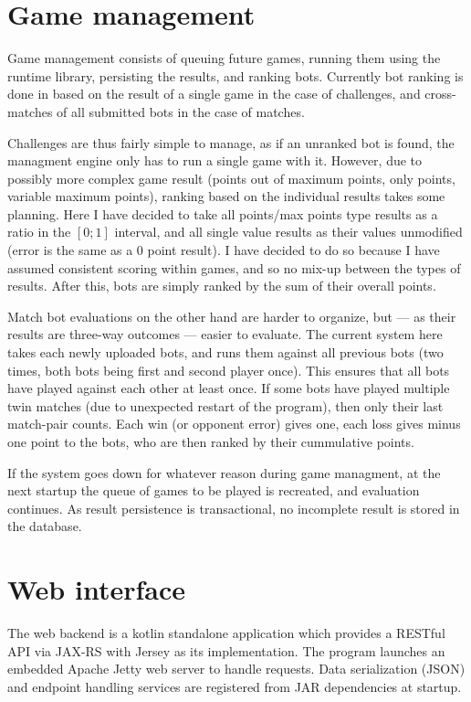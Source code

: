 	\section{Game management}

	Game management consists of queuing future games, running them using the runtime library, persisting the results, and ranking bots. Currently bot ranking is done in based on the result of a single game in the case of challenges, and cross-matches of all submitted bots in the case of matches.
	
	Challenges are thus fairly simple to manage, as if an unranked bot is found, the managment engine only has to run a single game with it. However, due to possibly more complex game result (points out of maximum points, only points, variable maximum points), ranking based on the individual results takes some planning. Here I have decided to take all points/max points type results as a ratio in the $[0;1]$ interval, and all single value results as their values unmodified (error is the same as a  0 point result). I have decided to do so because I have assumed consistent scoring within games, and so no mix-up between the types of results. After this, bots are simply ranked by the sum of their overall points.
	
	Match bot evaluations on the other hand are harder to organize, but --- as their results are three-way outcomes --- easier to evaluate. The current system here takes each newly uploaded bots, and runs them against all previous bots (two times, both bots being first and second player once). This ensures that all bots have played against each other at least once. If some bots have played multiple twin matches (due to unexpected restart of the program), then only their last match-pair counts. Each win (or opponent error) gives one, each loss gives minus one point to the bots, who are then ranked by their cummulative points.
	
	If the system goes down for whatever reason during game managment, at the next startup the queue of games to be played is recreated, and evaluation continues. As result persistence is transactional, no incomplete result is stored in the database.

	\section{Web interface}
	
	The web backend is a kotlin standalone application which provides a RESTful API via JAX-RS with Jersey as its implementation. The program launches an embedded Apache Jetty web server to handle requests. Data serialization (JSON) and endpoint handling services are registered from JAR dependencies at startup.

